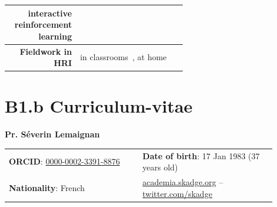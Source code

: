 \documentclass[11pt,a4paper]{report}
\newcommand{\eu}[1]{{\color{teal}\textbf{Guidelines EU ERC: #1}}}
\begin{document}
\begin{table}[h]
\begin{tabular}{rp{0.6\linewidth}}
        interactive reinforcement learning & \small \cite{senft2017leveraging,senft2017supervised, senft2019teaching} \\
        \midrule
        \textbf{Fieldwork in HRI} & \small in
        classrooms~\cite{hood2015when, lemaignan2016learning, jacq2016building,
        baxter2015wider,kennedy2016cautious,senft2018robots}, at home~\cite{mondada2015ranger}\\
        \bottomrule
    \end{tabular}
    \label{pi-expertise}
\end{table}



\newpage

\printbibliography





\newpage

\chapter{B1.b Curriculum-vitae}\label{the-principal-investigator}


{\LARGE \bf Pr. Séverin Lemaignan}

\vspace{2em}

\begin{tabular}{p{0.45\linewidth}p{0.45\linewidth}}
    \textbf{ORCID}:
    \href{http://orcid.org/0000-0002-3391-8876}{0000-0002-3391-8876} & \textbf{Date of birth}: 17 Jan 1983 (37 years old) \\
\textbf{Nationality}: French & \href{https://academia.skadge.org}{academia.skadge.org} -- \href{https://twitter.com/skadge}{twitter.com/skadge}
\end{tabular}
\end{document}
